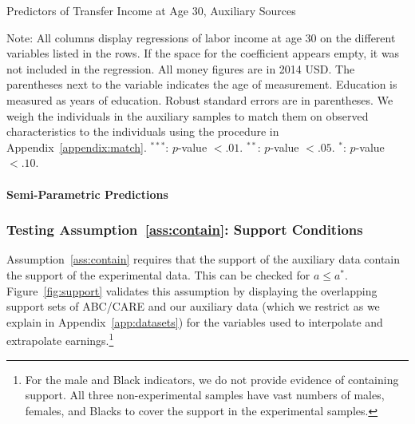 \begin{table}[H]
\begin{threeparttable}
\caption{Predictors of Transfer Income at Age 30, Auxiliary Sources}
\label{table:predtransferincome}
\centering
\footnotesize

\begin{tablenotes}
\footnotesize
\item Note: All columns display regressions of labor income at age 30 on the different variables listed in the rows. If the space for the coefficient appears empty, it was not included in the regression. All money figures are in 2014 USD. The parentheses next to the variable indicates the age of measurement. Education is measured as years of education. Robust standard errors are in parentheses. We weigh the individuals in the auxiliary samples to match them on observed characteristics to the individuals using the procedure in Appendix~\ref{appendix:match}. $^{***}$: $p$-value $< .01$. $^{**}$: $p$-value $< .05$. $^{*}$: $p$-value $< .10$.
\end{tablenotes}
\end{threeparttable}
\end{table}

\paragraph{Semi-Parametric Predictions} \label{appendix:nonpar}



\subsubsection{Testing Assumption~\ref{ass:contain}: Support Conditions}\label{app:containsupport}

Assumption~\ref{ass:contain} requires that the support of the auxiliary data contain the support of the experimental data. This can be checked for $a \leq a^\ast$. Figure~\ref{fig:support} validates this assumption by displaying the overlapping support sets of ABC/CARE and our auxiliary data (which we restrict as we explain in Appendix~\ref{app:datasets}) for the variables used to interpolate and extrapolate earnings.\footnote{For the male and Black indicators, we do not provide evidence of containing support. All three non-experimental samples have vast numbers of males, females, and Blacks to cover the support in the experimental samples.}\\ 

